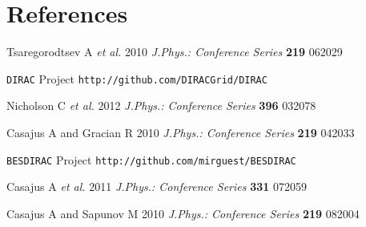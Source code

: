 \section*{References}
\begin{thebibliography}{9}
        Tsaregorodtsev A {\it et al.}
        2010 {\it J.Phys.: Conference Series}
        {\bf 219} 062029

        {\tt DIRAC} Project
        \verb"http://github.com/DIRACGrid/DIRAC"

        Nicholson C {\it et al.}
        2012 {\it J.Phys.: Conference Series}
        {\bf 396} 032078

        Casajus A and Gracian R
        2010 {\it J.Phys.: Conference Series}
        {\bf 219} 042033

        {\tt BESDIRAC} Project
        \verb"http://github.com/mirguest/BESDIRAC"

        Casajus A {\it et al.}
        2011 {\it J.Phys.: Conference Series}
        {\bf 331} 072059

        Casajus A and Sapunov M
        2010 {\it J.Phys.: Conference Series}
        {\bf 219} 082004
\end{thebibliography}
